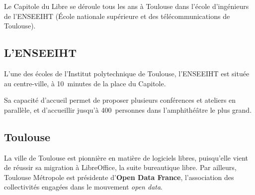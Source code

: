 
Le Capitole du Libre se déroule tous les ans à Toulouse dans l'école
 d'ingénieurs de l'ENSEEIHT (École nationale supérieure
 et des télécommunications de Toulouse). 

\subsection{L'ENSEEIHT}

L'une des écoles de l'Institut polytechnique de Toulouse, l'ENSEEIHT
 est située au centre-ville, à 10~minutes de la place du Capitole.

Sa capacité d'accueil permet de proposer plusieurs conférences et
 ateliers en parallèle, et d'accueillir jusqu'à 400~personnes dans
 l'amphithéâtre le plus grand.

\subsection{Toulouse}

La ville de Toulouse est pionnière en matière de logiciels libres,
 puisqu'elle vient de réussir sa migration à LibreOffice, la suite
 bureautique libre. Par ailleurs, Toulouse Métropole est présidente d’\textbf{Open Data France}, l'association des collectivités engagées dans le mouvement \textit{open data}.

